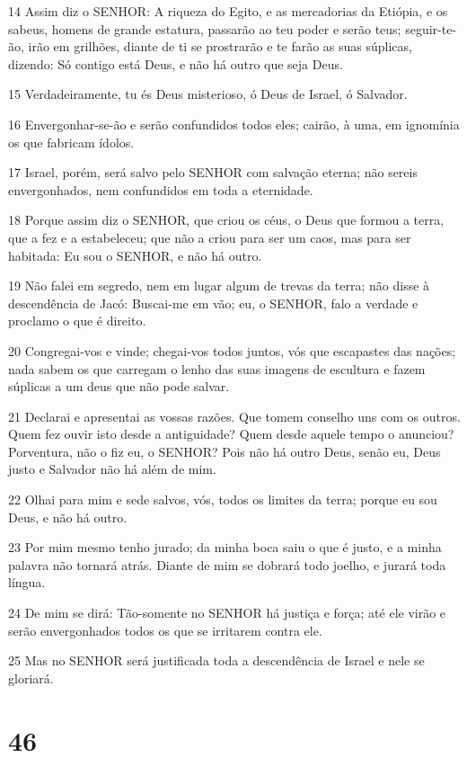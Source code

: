 \par 14 Assim diz o SENHOR: A riqueza do Egito, e as mercadorias da Etiópia, e os sabeus, homens de grande estatura, passarão ao teu poder e serão teus; seguir-te-ão, irão em grilhões, diante de ti se prostrarão e te farão as suas súplicas, dizendo: Só contigo está Deus, e não há outro que seja Deus.
\par 15 Verdadeiramente, tu és Deus misterioso, ó Deus de Israel, ó Salvador.
\par 16 Envergonhar-se-ão e serão confundidos todos eles; cairão, à uma, em ignomínia os que fabricam ídolos.
\par 17 Israel, porém, será salvo pelo SENHOR com salvação eterna; não sereis envergonhados, nem confundidos em toda a eternidade.
\par 18 Porque assim diz o SENHOR, que criou os céus, o Deus que formou a terra, que a fez e a estabeleceu; que não a criou para ser um caos, mas para ser habitada: Eu sou o SENHOR, e não há outro.
\par 19 Não falei em segredo, nem em lugar algum de trevas da terra; não disse à descendência de Jacó: Buscai-me em vão; eu, o SENHOR, falo a verdade e proclamo o que é direito.
\par 20 Congregai-vos e vinde; chegai-vos todos juntos, vós que escapastes das nações; nada sabem os que carregam o lenho das suas imagens de escultura e fazem súplicas a um deus que não pode salvar.
\par 21 Declarai e apresentai as vossas razões. Que tomem conselho uns com os outros. Quem fez ouvir isto desde a antiguidade? Quem desde aquele tempo o anunciou? Porventura, não o fiz eu, o SENHOR? Pois não há outro Deus, senão eu, Deus justo e Salvador não há além de mim.
\par 22 Olhai para mim e sede salvos, vós, todos os limites da terra; porque eu sou Deus, e não há outro.
\par 23 Por mim mesmo tenho jurado; da minha boca saiu o que é justo, e a minha palavra não tornará atrás. Diante de mim se dobrará todo joelho, e jurará toda língua.
\par 24 De mim se dirá: Tão-somente no SENHOR há justiça e força; até ele virão e serão envergonhados todos os que se irritarem contra ele.
\par 25 Mas no SENHOR será justificada toda a descendência de Israel e nele se gloriará.

\chapter{46}

